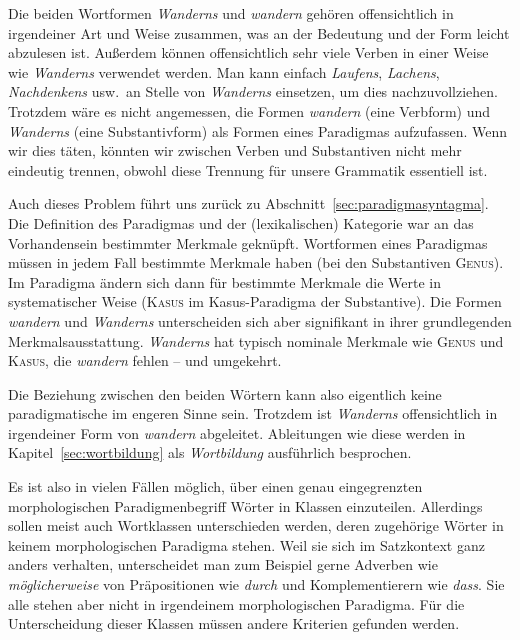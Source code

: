 Die beiden Wortformen \textit{Wanderns} und \textit{wandern} gehören offensichtlich in irgendeiner Art und Weise zusammen, was an der Bedeutung und der Form leicht abzulesen ist.
Außerdem können offensichtlich sehr viele Verben in einer Weise wie \textit{Wanderns} verwendet werden.
Man kann einfach \textit{Laufens}, \textit{Lachens}, \textit{Nachdenkens} usw.\ an Stelle von \textit{Wanderns} einsetzen, um dies nachzuvollziehen.
Trotzdem wäre es nicht angemessen, die Formen \textit{wandern} (eine Verbform) und \textit{Wanderns} (eine Substantivform) als Formen eines Paradigmas aufzufassen.
Wenn wir dies täten, könnten wir zwischen Verben und Substantiven nicht mehr eindeutig trennen, obwohl diese Trennung für unsere Grammatik essentiell ist.

Auch dieses Problem führt uns zurück zu Abschnitt~\ref{sec:paradigmasyntagma}.
Die Definition des Paradigmas und der (lexikalischen) Kategorie war an das Vorhandensein bestimmter Merkmale geknüpft.
Wortformen eines Paradigmas müssen in jedem Fall bestimmte Merkmale haben (bei den Substantiven \zB \textsc{Genus}).
Im Paradigma ändern sich dann für bestimmte Merkmale die Werte in systematischer Weise (\zB \textsc{Kasus} im Kasus-Paradigma der Substantive).
Die Formen \textit{wandern} und \textit{Wanderns} unterscheiden sich aber signifikant in ihrer grundlegenden Merkmalsausstattung.
\textit{Wanderns} hat typisch nominale Merkmale wie \textsc{Genus} und \textsc{Kasus}, die \textit{wandern} fehlen -- und umgekehrt.

\begin{exe}
\end{exe}


Die Beziehung zwischen den beiden Wörtern kann also eigentlich keine paradigmatische im engeren Sinne sein.
Trotzdem ist \textit{Wanderns} offensichtlich in irgendeiner Form von \textit{wandern} abgeleitet.
Ableitungen wie diese werden in Kapitel~\ref{sec:wortbildung} als \textit{Wortbildung} ausführlich besprochen.

Es ist also in vielen Fällen möglich, über einen genau eingegrenzten morphologischen Paradigmenbegriff Wörter in Klassen einzuteilen.
Allerdings sollen meist auch Wortklassen unterschieden werden, deren zugehörige Wörter in keinem morphologischen Paradigma stehen.
Weil sie sich im Satzkontext ganz anders verhalten, unterscheidet man zum Beispiel gerne Adverben wie \textit{möglicherweise} von Präpositionen wie \textit{durch} und Komplementierern wie \textit{dass}.
Sie alle stehen aber nicht in irgendeinem morphologischen Paradigma.
Für die Unterscheidung dieser Klassen müssen andere Kriterien gefunden werden.

